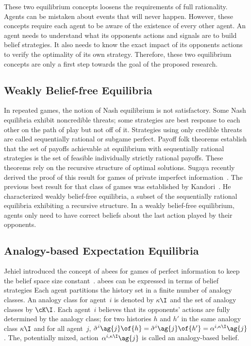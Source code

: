 These two equilibrium concepts loosens the requirements of full rationality.
Agents can be mistaken about events that will never happen.
However, these concepts require each agent to be aware of the existence of every other agent.
An agent needs to understand what its opponents actions and signals are to build belief strategies.
It also needs to know the exact impact of its opponents actions to verify the optimality of its own strategy.
Therefore, these two equilibrium concepts are only a first step towards the goal of the proposed research.

\subsection{Weakly Belief-free Equilibria}
In repeated games, the notion of Nash equilibrium is not satisfactory.
Some Nash equilibria exhibit noncredible threats; some strategies are best response to each other on the path of play but not off of it.
Strategies using only credible threats are called sequentially rational or subgame perfect.
Payoff folk theorems establish that the set of payoffs achievable at equilibrium with sequentially rational strategies is the set of feasible individually strictly rational payoffs.
These theorems rely on the recursive structure of optimal solutions.
Sugaya recently derived the proof of this result for games of private imperfect information~\cite{sugaya:2011}.
The previous best result for that class of games was established by Kandori~\cite{kandori:2011}.
He characterized weakly belief-free equilibria, a subset of the sequentially rational equilibria exhibiting a recursive structure.
In a weakly belief-free equilibrium, agents only need to have correct beliefs about the last action played by their opponents.

\subsection{Analogy-based Expectation Equilibria}
Jehiel introduced the concept of \acp{abee} for games of perfect information to keep the belief space size constant~\cite{jehiel:2005}.
\acp{abee} can be expressed in terms of belief strategies
Each agent partitions the history set in a finite number of analogy classes.
An analogy class for agent~\(i\) is denoted by \(\kappa\I\) and the set of analogy classes by \(\cK\I\).
Each agent~\(i\) believes that its opponents' actions are fully determined by the analogy class; for two histories \(h\) and \(h'\) in the same analogy class \(\kappa\I\) and for all agent~\(j\), \(\tilde{\sigma}\belief{i}\ag{j} \of{h} = \tilde{\sigma}\belief{i}\ag{j} \of{h'} = \alpha\belief{i,\kappa\I}\ag{j}\).
The, potentially mixed, action~\(\alpha\belief{i, \kappa\I}\ag{j}\) is called an analogy-based belief.


